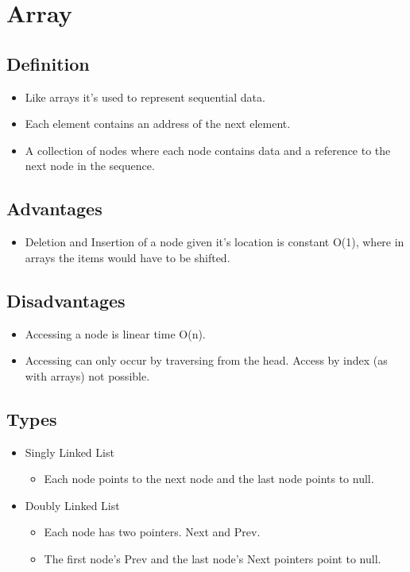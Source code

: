 \chapter{Array}

\section{Definition}
\begin{itemize}
	\item Like arrays it's used to represent sequential data.
	\item Each element contains an address of the next element.
	\item A collection of nodes where each node contains data and a reference to the next node in the sequence.
\end{itemize}

\section{Advantages}
\begin{itemize}
	\item Deletion and Insertion of a node given it's location is constant O(1), where in arrays the items would have to be shifted.
\end{itemize}

\section{Disadvantages}
\begin{itemize}
	\item Accessing a node is linear time O(n).
	\item Accessing can only occur by traversing from the head. Access by index (as with arrays) not possible.
\end{itemize}

\section{Types}
\begin{itemize}
	\item Singly Linked List
			\begin{itemize}
				\item Each node points to the next node and the last node points to null.
			\end{itemize}
	\item Doubly Linked List
			\begin{itemize}
				\item Each node has two pointers. Next and Prev.
				\item The first node's Prev and the last node's Next pointers point to null.
			\end{itemize}
\end{itemize}

